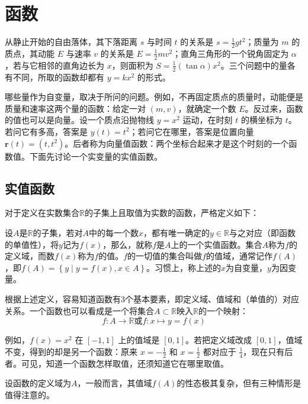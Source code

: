 \section{函数}
从静止开始的自由落体，其下落距离 \(s\) 与时间 \(t\) 的关系是 \(s=\frac12 gt^2\)；质量为 \(m\) 的质点，其动能 \(E\) 与速率 \(v\) 的关系是 \(E=\frac12 mv^2\)；直角三角形的一个锐角固定为 \(\alpha\)，若与它相邻的直角边长为 \(x\)，则面积为 \(S=\frac12(\tan\alpha)x^2\)。三个问题中的量各有不同，所取的函数却都有 \(y=kx^2\) 的形式。

哪些量作为自变量，取决于所问的问题。例如，不再固定质点的质量时，动能便是质量和速率这两个量的函数：给定一对 \((m,v)\)，就确定一个数 \(E\)。反过来，函数的值也可以是向量。设一个质点沿抛物线 \(y=x^2\) 运动，在时刻 \(t\) 的横坐标为 \(t\)。若问它有多高，答案是 \(y(t)=t^2\)；若问它在哪里，答案是位置向量 \(\mathbf r(t)=(t,t^2)\)。后者称为向量值函数：两个坐标合起来才是这个时刻的一个函数值。下面先讨论一个实变量的实值函数。

\subsection{实值函数}
对于定义在实数集合\(\mathbb{R}\)的子集上且取值为实数的函数，严格定义如下：

\begin{definition}
设\(A\)是\(\mathbb{R}\)的子集，若对\(A\)中的每一个数\(x\)，都有唯一确定的\(y \in \mathbb{R}\)与之对应（即函数的单值性），将\(y\)记为\(f(x)\)，那么，就称\(f\)是\(A\)上的一个{\heiti{}实值函数}。集合\(A\)称为\(f\)的定义域，而数\(f(x)\)称为\(f\)的值。\(f\)的一切值的集合叫做\(f\)的值域，通常记作\(f(A)\)，即\(f(A) = \left\{ y \mid y = f(x) , x \in A \right\}\)。习惯上，称上述的\(x\)为自变量，\(y\)为因变量。
\end{definition}

根据上述定义，容易知道函数有3个基本要素，即定义域、值域和（单值的）对应关系。一个函数也可以看成是一个将集合\(A \subset \mathbb{R}\)映入\(\mathbb{R}\)的一个映射：
\begin{equation}
f : A \longrightarrow \mathbb{R} \text{或} f : x \longmapsto y = f(x)
\end{equation}

例如，\(f(x)=x^2\) 在 \([-1,1]\) 上的值域是 \([0,1]\)。若把定义域改成 \([0,1]\)，值域不变，得到的却是另一个函数：原来 \(x=-\frac12\) 和 \(x=\frac12\) 都对应于 \(\frac14\)，现在只有后者。可见，知道一个函数怎样取值，还须知道它在哪里取值。

设函数的定义域为\(A\)，一般而言，其值域\(f(A)\)的性态极其复杂，但有三种情形是值得注意的。

